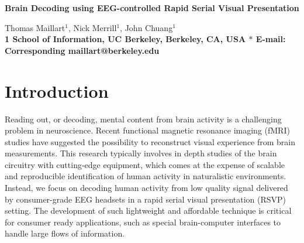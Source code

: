 \documentclass[10pt]{article}
\date{}
\begin{document}
\begin{flushleft}
{\Large
\textbf{Brain Decoding using EEG-controlled Rapid Serial Visual Presentation}
}

Thomas Maillart$^{1}$, 
Nick Merrill$^{1}$, 
John Chuang$^{1}$
\\
\bf{1} School of Information, UC Berkeley, Berkeley, CA, USA
$\ast$ E-mail: Corresponding maillart@berkeley.edu
\end{flushleft}

%

\section{Introduction}
Reading out, or decoding, mental content from brain activity is a challenging problem in neuroscience. Recent functional magnetic resonance imaging (fMRI) studies have suggested the possibility to reconstruct visual experience from brain measurements\cite{kay2008identifying,naselaris2009bayesian,nishimoto2011reconstructing}. This research typically involves in depth studies of the brain circuitry with cutting-edge equipment, which comes at the expense of scalable and reproducible identification of human activity in naturalistic environments. Instead, we focus on decoding human activity from low quality signal delivered by consumer-grade EEG headsets in a rapid serial visual presentation (RSVP) setting. The development of such lightweight and affordable technique is critical for consumer ready applications, such as special brain-computer interfaces to handle large flows of information.
\end{document}
